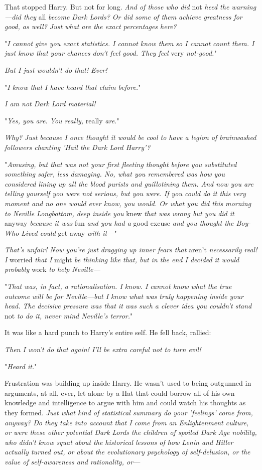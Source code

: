 That stopped Harry. But not for long. \emph{And of those who did} not\emph{ 
heed the warning---did they} all\emph{ become Dark Lords? Or did some of them 
achieve greatness for good, as well? Just what are the exact percentages here?}

"\emph{I cannot give you exact statistics. I cannot know them so I cannot count 
them. I just know that your chances don't feel good. They feel} very\emph{ 
not-good.}"

\emph{But I just wouldn't do that! Ever!}

"\emph{I know that I have heard that claim before.}"

\emph{I am not Dark Lord material!}

"\emph{Yes, you are. You really,} really\emph{ are.}"

\emph{Why? Just because I once thought it would be cool to have a legion of 
brainwashed followers chanting 'Hail the Dark Lord Harry'?}

"\emph{Amusing, but that was not your first fleeting thought before you 
substituted something safer, less damaging. No, what you remembered was how you 
considered lining up all the blood purists and guillotining them. And now you 
are telling yourself you were not serious, but you were. If you could do it 
this very moment and no one would ever know, you would. Or what you did this 
morning to Neville Longbottom, deep inside you} knew\emph{ that was wrong but 
you did it} anyway\emph{ because it was} fun\emph{ and you had a} good 
excuse\emph{ and you thought the Boy-Who-Lived could} get away\emph{ with 
it---}"

\emph{That's unfair! Now you're just dragging up inner fears that} aren't\emph{ 
necessarily real! I} worried\emph{ that I} might\emph{ be thinking like that, 
but in the end I decided it would probably} work\emph{ to help Neville---}

"\emph{That was, in fact, a rationalisation. I know. I cannot know what the 
true outcome will be for Neville---but I know what was truly happening inside 
your head. The decisive pressure was that it was such a clever idea you 
couldn't stand} not\emph{ to do it, never mind Neville's terror.}"

It was like a hard punch to Harry's entire self. He fell back, rallied:

\emph{Then I won't do that again! I'll be extra careful not to turn evil!}

"\emph{Heard it.}"

Frustration was building up inside Harry. He wasn't used to being outgunned in 
arguments, at all, ever, let alone by a Hat that could borrow all of his own 
knowledge and intelligence to argue with him and could watch his thoughts as 
they formed. \emph{Just what kind of statistical summary do your 'feelings' 
come from, anyway? Do they take into account that I come from an Enlightenment 
culture, or were these other potential Dark Lords the children of spoiled Dark 
Age nobility, who didn't know squat about the historical lessons of how Lenin 
and Hitler actually turned out, or about the evolutionary psychology of 
self-delusion, or the value of self-awareness and rationality, or---}

